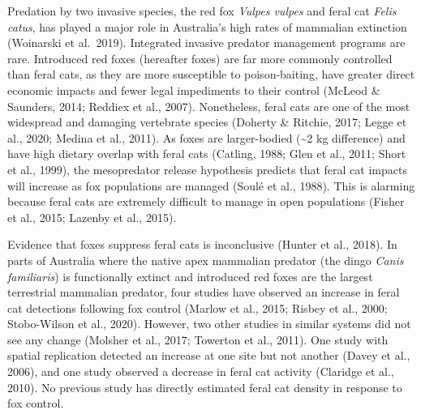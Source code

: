 \documentclass[]{elsarticle} %
\begin{document}
Predation by two invasive species, the red fox \emph{Vulpes vulpes} and feral cat \emph{Felis catus}, has played a major role in Australia's high rates of mammalian extinction (Woinarski et al.~2019).
Integrated invasive predator management programs are rare.
Introduced red foxes (hereafter foxes) are far more commonly controlled than feral cats, as they are more susceptible to poison-baiting, have greater direct economic impacts and fewer legal impediments to their control (McLeod \& Saunders, 2014; Reddiex et al., 2007).
Nonetheless, feral cats are one of the most widespread and damaging vertebrate species (Doherty \& Ritchie, 2017; Legge et al., 2020; Medina et al., 2011).
As foxes are larger-bodied (\textasciitilde2 kg difference) and have high dietary overlap with feral cats (Catling, 1988; Glen et al., 2011; Short et al., 1999), the mesopredator release hypothesis predicts that feral cat impacts will increase as fox populations are managed (Soulé et al., 1988).
This is alarming because feral cats are extremely difficult to manage in open populations (Fisher et al., 2015; Lazenby et al., 2015).

Evidence that foxes suppress feral cats is inconclusive (Hunter et al., 2018).
In parts of Australia where the native apex mammalian predator (the dingo \emph{Canis familiaris}) is functionally extinct and introduced red foxes are the largest terrestrial mammalian predator, four studies have observed an increase in feral cat detections following fox control (Marlow et al., 2015; Risbey et al., 2000; Stobo-Wilson et al., 2020).
However, two other studies in similar systems did not see any change (Molsher et al., 2017; Towerton et al., 2011).
One study with spatial replication detected an increase at one site but not another (Davey et al., 2006), and one study observed a decrease in feral cat activity (Claridge et al., 2010).
No previous study has directly estimated feral cat density in response to fox control.
\end{document}

